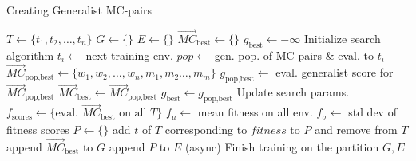             \begin{algorithm}[!ht]
            \footnotesize %
            \caption{Creating Generalist MC-pairs}
            \begin{algorithmic}[1] %
                \State $T \gets \{t_1, t_2, \ldots, t_n\}$
                \State $G \gets \{\}$ 
                \State $E \gets \{\}$
                    \State $\overrightarrow{MC}_{\text{best}} \gets \{\}$
                    \State $g_{\text{best}} \gets -\infty$
                    \State Initialize search algorithm
                    \State
                        \State $t_i \gets$ next training env.
                        \State $pop \gets$ gen. pop. of MC-pairs \& eval. to $t_i$
                        \State $\overrightarrow{MC}_{\text{pop,best}} \gets \{w_1, w_2, \ldots, w_n, m_1, m_2 \ldots, m_m\}$
                        \State $g_{\text{pop,best}} \gets$ eval. generalist score for $\overrightarrow{MC}_{\text{pop,best}}$
                            \State $\overrightarrow{MC}_{\text{best}} \gets \overrightarrow{MC}_{\text{pop,best}}$
                            \State $g_{\text{best}} \gets g_{\text{pop,best}}$
                        \EndIf
                        \State Update search params.
                    \EndWhile
                    \State
                    \State $f_{\text{scores}} \gets \{\text{eval. } \overrightarrow{MC}_{\text{best}} \text{ on all } T\}$
                    \State $f_{\mu} \gets$ mean fitness on all env.
                    \State $f_{\sigma} \gets$ std dev of fitness scores
                    \State $P \gets \{\}$
                            \State add $t$ of $T$ corresponding to $fitness$ to $P$ and remove from $T$
                        \EndIf
                    \EndFor
                    \State append $\overrightarrow{MC}_{\text{best}}$ to $G$
                    \State append $P$ to $E$
                    \State (async) Finish training on the partition
                \EndWhile
                \State \Return $G,E$
            \end{algorithmic}
            \end{algorithm}

